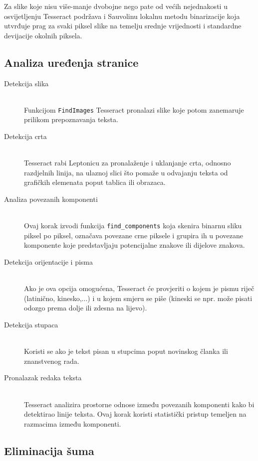 \documentclass[zavrsnirad]{fer}
\begin{document}
Za slike koje nisu više-manje dvobojne nego pate od većih nejednakosti u osvijetljenju Tesseract podržava i Sauvolinu \cite{Sauvola1997} lokalnu metodu binarizacije koja utvrđuje prag za svaki piksel slike na temelju srednje vrijednosti i standardne devijacije okolnih piksela.


\subsection{Analiza uređenja stranice}

\begin{description}
	\item[Detekcija slika] \hfill \\ Funkcijom \texttt{FindImages} Tesseract pronalazi slike koje potom zanemaruje prilikom prepoznavanja teksta.
	\item[Detekcija crta] \hfill \\ Tesseract rabi Leptonicu za pronalaženje i uklanjanje crta, odnosno razdjelnih linija, na ulaznoj slici što pomaže u odvajanju teksta od grafičkih elemenata poput tablica ili obrazaca.
	\item[Analiza povezanih komponenti] \hfill \\ Ovaj korak izvodi funkcija \texttt{find\_components} koja skenira binarnu sliku piksel po piksel, označava povezane crne piksele i grupira ih u povezane komponente koje predstavljaju potencijalne znakove ili dijelove znakova.
	\item[Detekcija orijentacije i pisma] \hfill \\ Ako je ova opcija omogućena, Tesseract će provjeriti o kojem je pismu riječ (latinično, kinesko,...) i u kojem smjeru se piše (kineski se npr. može pisati odozgo prema dolje ili zdesna na lijevo).
	\item[Detekcija stupaca] \hfill \\ Koristi se ako je tekst pisan u stupcima poput novinskog članka ili znanstvenog rada.
	\item[Pronalazak redaka teksta] \hfill \\ Tesseract analizira prostorne odnose između povezanih komponenti kako bi detektirao linije teksta. Ovaj korak koristi statistički pristup temeljen na razmacima između komponenti.
\end{description}

\subsection{Eliminacija šuma}
\end{document}
